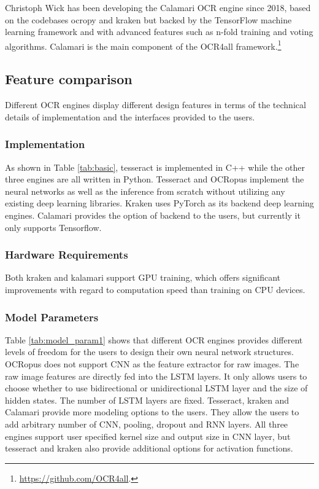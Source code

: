 \documentclass[conference]{IEEEtran}
\begin{document}
Christoph Wick has been developing the Calamari
\cite{DBLP:journals/corr/abs-1807-02004} OCR engine since 2018, based on the
codebases ocropy and kraken but backed by the TensorFlow machine learning
framework and with advanced features such as n-fold training and
voting algorithms. Calamari is the main component of the OCR4all
framework.\footnote{\url{https://github.com/OCR4all}.}

\subsection*{Feature comparison}


Different OCR engines display different design features in terms of the
technical details of implementation and the interfaces provided to the users.

\subsubsection*{Implementation}

As shown in Table \ref{tab:basic}, tesseract is implemented in C++ while the
other three engines are all written in Python. Tesseract and OCRopus
implement the neural networks as well as the inference from scratch without
utilizing any existing deep learning libraries. Kraken uses PyTorch as its
backend deep learning engines. Calamari provides the option of backend to the
users, but currently it only supports Tensorflow.

\subsubsection*{Hardware Requirements}

Both kraken and kalamari support GPU training, which offers significant
improvements with regard to computation speed than training on CPU devices.

\subsubsection*{Model Parameters}

Table \ref{tab:model_param1} shows that different OCR engines provides
different levels of freedom for the users to design their own neural network
structures. OCRopus does not support CNN as the feature extractor for raw
images. The raw image features are directly fed into the LSTM layers. It only
allows users to choose whether to use bidirectional or unidirectional LSTM
layer and the size of hidden states. The number of LSTM layers are fixed.
Tesseract, kraken and Calamari provide more modeling options to the users. They
allow the users to add arbitrary number of CNN, pooling, dropout and RNN
layers. All three engines support user specified kernel size and output size in
CNN layer, but tesseract and kraken also provide additional options for
activation functions.
\end{document}

